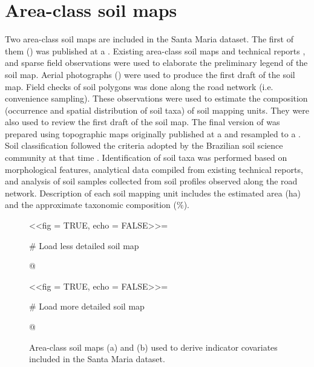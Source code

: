 
\tocless\section{Area-class soil maps}
\label{sec:covar-data-soil-maps}

Two area-class soil maps are included in the Santa Maria dataset. The first of them (\soilOld{}) was published 
at a  \cite{AzolinEtAl1988}. Existing area-class soil maps and technical reports 
\cite{Brasil1973, Azolin1977, MacielEtAl1987a, MacielEtAl1987, AbraoEtAl1988}, and sparse field observations 
were used to elaborate the preliminary legend of the soil map. Aerial photographs () were used to 
produce the first draft of the soil map. Field checks of soil polygons was done along the road network (i.e. 
convenience sampling). These observations were used to estimate the composition (occurrence and spatial 
distribution of soil taxa) of soil mapping units. They were also used to review the first draft of the soil 
map. The final version of \soilOld{} was prepared using topographic maps originally published at a 
 and resampled to a . Soil classification followed the criteria adopted by the 
Brazilian soil science community at that time \cite{Brasil1973, CamargoEtAl1982, Carvalho1982, LemosEtAl1982, 
OlmosEtAl1982}. Identification of soil taxa was performed based on morphological features, analytical data 
compiled from existing technical reports, and analysis of soil samples collected from soil profiles observed 
along the road network. Description of each soil mapping unit includes the estimated area (\si{\hectare}) and 
the approximate taxonomic composition (\si{\percent}).

\begin{figure}[!ht]
 \centering
 \begin{minipage}[b]{63mm}
  \subcaption{}
  \centering
  <<fig = TRUE, echo = FALSE>>=
   
   # Load less detailed soil map
   
  @
 \end{minipage}
 
 \begin{minipage}[b]{63mm}
  \subcaption{}
  \centering
  <<fig = TRUE, echo = FALSE>>=
   
   # Load more detailed soil map
   
  @
 \end{minipage} 
 \caption{Area-class soil maps (a) \soilOld{} and (b) \soilNew{} used to derive indicator covariates included 
 in the Santa Maria dataset.}
\label{fig:covar-data-soil-maps}
\end{figure}

